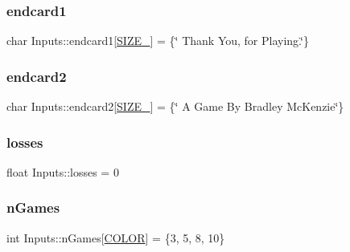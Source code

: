 \mbox{\label{struct_inputs_aeaa5f5939511046bc20580b4f9ffb4af}} 
\subsubsection{\texorpdfstring{endcard1}{endcard1}}
{\footnotesize\ttfamily char Inputs\+::endcard1\mbox{[}\hyperlink{main_8cpp_a449535d4215a26529b13febc509c199c}{S\+I\+Z\+E\+\_}\mbox{]} = \{\char`\"{} Thank You, for Playing.\char`\"{}\}}

\mbox{\label{struct_inputs_a1b0aa4e5a7bbc8c59633477ab06b90ec}} 
\subsubsection{\texorpdfstring{endcard2}{endcard2}}
{\footnotesize\ttfamily char Inputs\+::endcard2\mbox{[}\hyperlink{main_8cpp_aef76f3385c12d0d696e38d02a917359f}{S\+I\+Z\+E\+\_}\mbox{]} = \{\char`\"{} A Game By Bradley Mc\+Kenzie\char`\"{}\}}

\mbox{\label{struct_inputs_a55580df8b5ddf655fc8f144ac1037863}} 
\subsubsection{\texorpdfstring{losses}{losses}}
{\footnotesize\ttfamily float Inputs\+::losses = 0}

\mbox{\label{struct_inputs_a8b7271740a32d3d765130231e98dee68}} 
\subsubsection{\texorpdfstring{n\+Games}{nGames}}
{\footnotesize\ttfamily int Inputs\+::n\+Games\mbox{[}\hyperlink{main_8cpp_aa6d8034c897057de595a4511a4e7a837}{C\+O\+L\+OR}\mbox{]} = \{3, 5, 8, 10\}}

\mbox{\label{struct_inputs_a8c55eda886194176c889c08a30a669a6}} 
